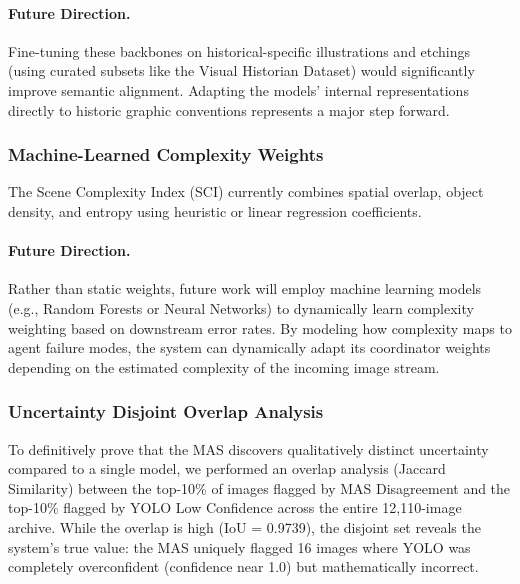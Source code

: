 \documentclass[12pt,onecolumn,a4paper]{IEEEtran}
\begin{document}
\paragraph{Future Direction.} Fine-tuning these backbones on historical-specific illustrations and etchings (using curated subsets like the Visual Historian Dataset) would significantly improve semantic alignment. Adapting the models' internal representations directly to historic graphic conventions represents a major step forward.

\subsubsection{Machine-Learned Complexity Weights}
The Scene Complexity Index (SCI) currently combines spatial overlap, object density, and entropy using heuristic or linear regression coefficients.
\paragraph{Future Direction.} Rather than static weights, future work will employ machine learning models (e.g., Random Forests or Neural Networks) to dynamically learn complexity weighting based on downstream error rates. By modeling how complexity maps to agent failure modes, the system can dynamically adapt its coordinator weights depending on the estimated complexity of the incoming image stream.

\subsubsection{Uncertainty Disjoint Overlap Analysis}
To definitively prove that the MAS discovers qualitatively distinct uncertainty compared to a single model, we performed an overlap analysis (Jaccard Similarity) between the top-10\% of images flagged by MAS Disagreement and the top-10\% flagged by YOLO Low Confidence across the entire 12,110-image archive. While the overlap is high (IoU = 0.9739), the disjoint set reveals the system's true value: the MAS uniquely flagged 16 images where YOLO was completely overconfident (confidence near 1.0) but mathematically incorrect. 
\end{document}
